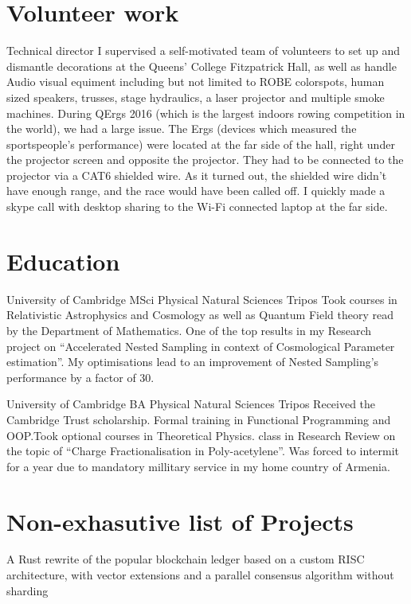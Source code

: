 \documentclass{CurriculumVitae}[10pt, condensed]
\begin{document}
{  \section*{Volunteer work} 
  {Technical director} {I supervised a self-motivated team of
    volunteers to set up and dismantle decorations at the Queens'
    College Fitzpatrick Hall, as well as handle Audio visual equiment
    including but not limited to ROBE colorspots, human sized
    speakers, trusses, stage hydraulics, a laser projector and
    multiple smoke machines.  During QErgs 2016 (which is the largest
    indoors rowing competition in the world), we had a large
    issue. The Ergs (devices which measured the sportspeople's
    performance) were located at the far side of the hall, right under
    the projector screen and opposite the projector. They had to be
    connected to the projector via a CAT6 shielded wire. As it turned
    out, the shielded wire didn't have enough range, and the race
    would have been called off.  I quickly made a skype call with
    desktop sharing to the Wi-Fi connected laptop at the far side. }
  \pagebreak{} \section*{Education}%

   {University of Cambridge} {MSci }
  {Physical Natural Sciences Tripos} {Took courses in Relativistic
    Astrophysics and Cosmology as well as Quantum Field theory read by
    the Department of Mathematics. One of the top results in my
    Research project on ``Accelerated Nested Sampling in context of
    Cosmological Parameter estimation''. My optimisations lead to an
    improvement of Nested Sampling's performance by a factor of 30. }

  {University of Cambridge} {BA }{Physical Natural Sciences
    Tripos} {Received the Cambridge Trust scholarship. Formal training
    in Functional Programming and OOP.\@ Took optional courses in
    Theoretical Physics.  class in Research Review on the topic
    of ``Charge Fractionalisation in Poly-acetylene''. Was forced to
    intermit for a year due to mandatory millitary service in my home
    country of Armenia. }

  \section*{Non-exhasutive list of Projects}%
  {A Rust rewrite of the popular blockchain ledger based on a custom
    RISC architecture, with vector extensions and a parallel consensus
    algorithm without sharding}

}
\end{document}
